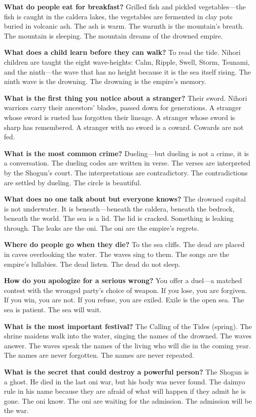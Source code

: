 \begin{almanac}
\textbf{What do people eat for breakfast?} Grilled fish and pickled vegetables---the fish is caught in the caldera lakes, the vegetables are fermented in clay pots buried in volcanic ash. The ash is warm. The warmth is the mountain's breath. The mountain is sleeping. The mountain dreams of the drowned empire.

\textbf{What does a child learn before they can walk?} To read the tide. Nihori children are taught the eight wave-heights: Calm, Ripple, Swell, Storm, Tsunami, and the ninth---the wave that has no height because it is the sea itself rising. The ninth wave is the drowning. The drowning is the empire's memory.

\textbf{What is the first thing you notice about a stranger?} Their sword. Nihori warriors carry their ancestors' blades, passed down for generations. A stranger whose sword is rusted has forgotten their lineage. A stranger whose sword is sharp has remembered. A stranger with no sword is a coward. Cowards are not fed.

\textbf{What is the most common crime?} Dueling---but dueling is not a crime, it is a conversation. The dueling codes are written in verse. The verses are interpreted by the Shogun's court. The interpretations are contradictory. The contradictions are settled by dueling. The circle is beautiful.

\textbf{What does no one talk about but everyone knows?} The drowned capital is not underwater. It is beneath---beneath the caldera, beneath the bedrock, beneath the world. The sea is a lid. The lid is cracked. Something is leaking through. The leaks are the oni. The oni are the empire's regrets.

\textbf{Where do people go when they die?} To the sea cliffs. The dead are placed in caves overlooking the water. The waves sing to them. The songs are the empire's lullabies. The dead listen. The dead do not sleep.

\textbf{How do you apologize for a serious wrong?} You offer a duel---a matched contest with the wronged party's choice of weapon. If you lose, you are forgiven. If you win, you are not. If you refuse, you are exiled. Exile is the open sea. The sea is patient. The sea will wait.

\textbf{What is the most important festival?} The Calling of the Tides (spring). The shrine maidens walk into the water, singing the names of the drowned. The waves answer. The waves speak the names of the living who will die in the coming year. The names are never forgotten. The names are never repeated.

\textbf{What is the secret that could destroy a powerful person?} The Shogun is a ghost. He died in the last oni war, but his body was never found. The daimyo rule in his name because they are afraid of what will happen if they admit he is gone. The oni know. The oni are waiting for the admission. The admission will be the war.
\end{almanac}


